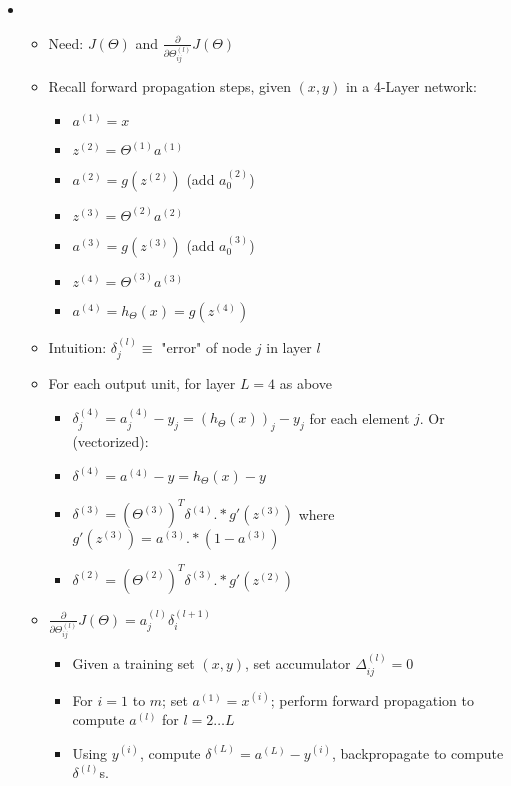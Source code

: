 \documentclass[letterpaper,10pt]{article}
\begin{document}
\begin{itemize}
\item 
	\begin{itemize}
	\item Need: $J(\Theta)$ and $\frac{\partial}{\partial \Theta_{ij}^{(l)}} J(\Theta)$
	\item Recall forward propagation steps, given $(x,y)$ in a 4-Layer network:
		\begin{itemize}
		\item $a^{(1)} = x$
		\item $z^{(2)} = \Theta^{(1)} a^{(1)}$
		\item $a^{(2)} = g\left( z^{(2)} \right)$ (add $a_0^{(2)}$)
		\item $z^{(3)} = \Theta^{(2)} a^{(2)}$
		\item $a^{(3)} = g\left( z^{(3)} \right)$ (add $a_0^{(3)}$)
		\item $z^{(4)} = \Theta^{(3)} a^{(3)}$
		\item $a^{(4)} = h_\Theta(x) = g\left( z^{(4)} \right)$
		\end{itemize}
	\item Intuition: $\delta_j^{(l)} \equiv$ "error" of node $j$ in layer $l$
	\item For each output unit, for layer $L=4$ as above
		\begin{itemize}
		\item $\delta_j^{(4)} = a_j^{(4)} - y_j = \left(h_\Theta(x)\right)_j - y_j$ for each element $j$. Or (vectorized):
		\item $\delta^{(4)} = a^{(4)} - y = h_\Theta(x) - y$
		\item $\delta^{(3)} = \left( \Theta^{(3)} \right)^T \delta^{(4)} . * g'\left( z^{(3)} \right)$  where $g'\left( z^{(3)} \right) = a^{(3)}.*(1-a^{(3)})$
		\item $\delta^{(2)} = \left( \Theta^{(2)} \right)^T \delta^{(3)} . * g'\left( z^{(2)} \right)$
		\end{itemize}
	\item $\frac{\partial}{\partial \Theta_{ij}^{(l)}} J(\Theta) = a_j^{(l)} \delta_i^{(l+1)}$
		\begin{itemize}
		\item Given a training set $(x,y)$, set accumulator $\Delta_{ij}^{(l)}=0$
		\item For $i=1$ to $m$; set $a^{(1)}=x^{(i)}$; perform forward propagation to compute $a^{(l)}$ for $l=2\ldots L$
		\item Using $y^{(i)}$, compute $\delta^{(L)}=a^{(L)}-y^{(i)}$, backpropagate to compute $\delta^{(l)}$s.

\end{itemize}
\end{itemize}
\end{itemize}
\end{document}
